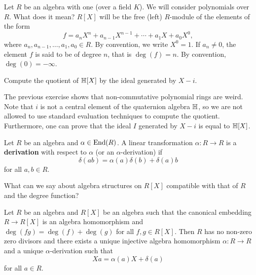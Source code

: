 \chapter{}


Let $R$ be an algebra with one (over a field $K$). 
We will consider polynomials over $R$. What does it mean? $R[X]$ will 
be the free (left) $R$-module of the elements of the form
\[
f=a_nX^n+a_{n-1}X^{n-1}+\cdots+a_1X+a_0X^0,
\]
where $a_n,a_{n-1},\dots,a_1,a_0\in R$. By convention, we write $X^0=1$. 
If $a_n\ne 0$, the element
$f$ is said to be of degree $n$, that is 
$\deg(f)=n$. By convention,
$\deg(0)=-\infty$. 

\begin{exercise}
    Compute the quotient of $\mathbb{H}[X]$ by the ideal generated by $X-i$. 
\end{exercise}

The previous exercise shows that non-commutative polynomial rings are weird. Note that $i$ is not a central 
element of the quaternion algebra $\mathbb{H}$, so we are not allowed to use standard evaluation techniques to compute
the quotient. Furthermore, one can prove that the ideal $I$ generated by $X-i$ is equal to $\mathbb{H}[X]$. 

\begin{definition}
    Let $R$ be an algebra and $\alpha\in\operatorname{End}(R)$. A linear transformation $\alpha\colon R\to R$ is a \textbf{derivation}
    with respect to $\alpha$ (or an 
    $\alpha$-derivation) if 
    \[
    \delta(ab)=\alpha(a)\delta(b)+\delta(a)b
    \]
    for all $a,b\in R$. 
\end{definition}

What can we say about algebra structures on $R[X]$ compatible with that of $R$ and 
the degree function? 

\begin{theorem}
    Let $R$ be an algebra and $R[X]$ be an algebra such that 
    the canonical embedding $R\to R[X]$ is an algebra homomorphism and $\deg(fg)=\deg(f)+\deg(g)$ 
    for all $f,g\in R[X]$. Then $R$ has no non-zero zero divisors and there exists a unique injective algebra homomorphism 
    $\alpha\colon R\to R$ and a unique $\alpha$-derivation such that 
    \[
    Xa=\alpha(a)X+\delta(a)
    \]
    for all $a\in R$.    
\end{theorem}

